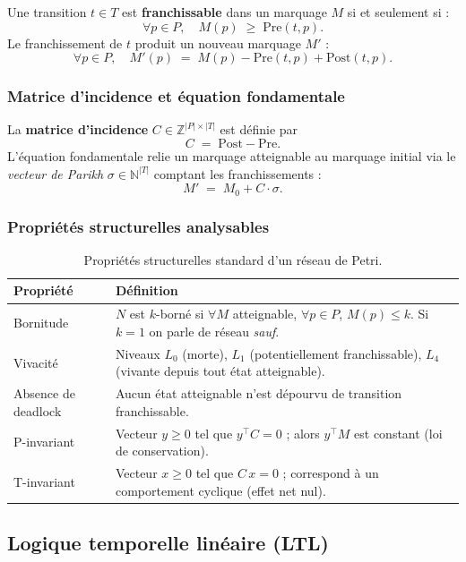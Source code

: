 \documentclass[11pt,a4paper]{article}
\begin{document}
Une transition $t \in T$ est \textbf{franchissable} dans un marquage $M$
si et seulement si :
\[
\forall p \in P,\quad M(p) \;\geq\; \mathrm{Pre}(t, p).
\]
Le franchissement de $t$ produit un nouveau marquage $M'$ :
\[
\forall p \in P,\quad M'(p) \;=\; M(p) - \mathrm{Pre}(t, p) + \mathrm{Post}(t, p).
\]

\subsubsection{Matrice d'incidence et équation fondamentale}

La \textbf{matrice d'incidence} $C \in \mathbb{Z}^{|P| \times |T|}$ est définie par
\[
C \;=\; \mathrm{Post} - \mathrm{Pre}.
\]
L'équation fondamentale relie un marquage atteignable au marquage initial via
le \emph{vecteur de Parikh} $\sigma \in \mathbb{N}^{|T|}$ comptant les
franchissements :
\[
M' \;=\; M_0 + C \cdot \sigma.
\]

\subsubsection{Propriétés structurelles analysables}

\begin{table}[H]
\centering\small
\begin{tabularx}{\linewidth}{l X}
\toprule
\rowcolor{tableheader}\textbf{Propriété} & \textbf{Définition} \\
\midrule
Bornitude
& $N$ est $k$-borné si $\forall M$ atteignable, $\forall p \in P$,
  $M(p) \leq k$. Si $k=1$ on parle de réseau \emph{sauf}. \\
Vivacité
& Niveaux $L_0$ (morte), $L_1$ (potentiellement franchissable),
  $L_4$ (vivante depuis tout état atteignable). \\
Absence de deadlock
& Aucun état atteignable n'est dépourvu de transition franchissable. \\
P-invariant
& Vecteur $y \geq 0$ tel que $y^\top C = 0$ ; alors $y^\top M$ est constant
  (loi de conservation). \\
T-invariant
& Vecteur $x \geq 0$ tel que $C\,x = 0$ ; correspond à un comportement cyclique
  (effet net nul). \\
\bottomrule
\end{tabularx}
\caption{Propriétés structurelles standard d'un réseau de Petri.}
\end{table}

\subsection{Logique temporelle linéaire (LTL)}
\end{document}

